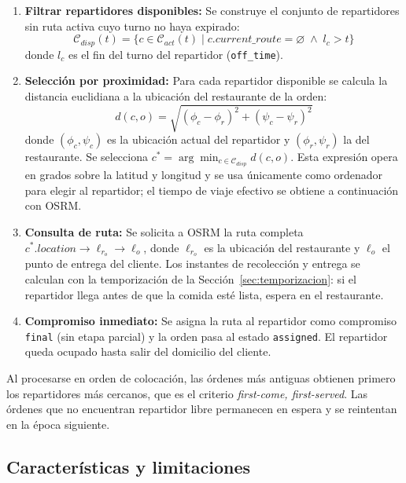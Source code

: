 \documentclass[12pt,letterpaper,oneside]{book}
\begin{document}
	\begin{enumerate}
		\item \textbf{Filtrar repartidores disponibles:} Se construye el conjunto de repartidores sin ruta 
		activa cuyo turno no haya expirado:
		\begin{equation}
			\mathcal{C}_{disp}(t) = \{c \in \mathcal{C}_{act}(t) \mid c.\textit{current\_route} = \varnothing 
			\;\wedge\; l_c > t\}
		\end{equation}
		donde $l_c$ es el fin del turno del repartidor (\texttt{off\_time}).

		\item \textbf{Selección por proximidad:} Para cada repartidor disponible se calcula la distancia
		euclidiana a la ubicación del restaurante de la orden:
		\begin{equation}
			d(c, o) = \sqrt{(\phi_c - \phi_r)^2 + (\psi_c - \psi_r)^2}
		\end{equation}
		donde $(\phi_c, \psi_c)$ es la ubicación actual del repartidor y $(\phi_r, \psi_r)$ la del
		restaurante. Se selecciona $c^* = \arg\min_{c \in \mathcal{C}_{disp}} d(c, o)$.
		Esta expresión opera en grados sobre la latitud y longitud y se usa
		únicamente como ordenador para elegir al repartidor; el tiempo de viaje
		efectivo se obtiene a continuación con OSRM.

		\item \textbf{Consulta de ruta:} Se solicita a OSRM la ruta completa 
		$c^*.\textit{location} \to \ell_{r_o} \to \ell_o$, donde $\ell_{r_o}$ es la ubicación del restaurante 
		y $\ell_o$ el punto de entrega del cliente.  Los instantes de recolección y entrega se
		calculan con la temporización de la Sección~\ref{sec:temporizacion}: si el repartidor llega
		antes de que la comida esté lista, espera en el restaurante.

		\item \textbf{Compromiso inmediato:} Se asigna la ruta al repartidor como compromiso 
		\texttt{final} (sin etapa parcial) y la orden pasa al estado \texttt{assigned}.  El
		repartidor queda ocupado hasta salir del domicilio del cliente.
	\end{enumerate}

	Al procesarse en orden de colocación, las órdenes más antiguas obtienen primero los
	repartidores más cercanos, que es el criterio \textit{first-come, first-served}.  Las órdenes
	que no encuentran repartidor libre permanecen en espera y se reintentan en la época siguiente.

	\subsection{Características y limitaciones}
\end{document}

